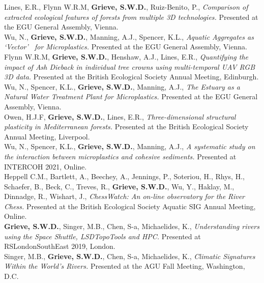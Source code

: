 \documentclass[10pt, a4paper]{article}
\newcommand{\student}{\textbf{\textsuperscript{\textdagger}}}
\newcommand{\years}[1]{\marginnote{\scriptsize #1}}
\begin{document}
\years{2023} Lines, E.R., Flynn W.R.M\student, \textbf{Grieve, S.W.D.}, Ruiz-Benito, P., \textit{Comparison of extracted ecological features of forests from multiple 3D technologies.} Presented at the EGU General Assembly, Vienna.\\[0.05cm]

\years{2023}Wu, N.\student, \textbf{Grieve, S.W.D.}, Manning, A.J., Spencer, K.L., \textit{Aquatic Aggregates as \lq Vector\rq~ for Microplastics.} Presented at the EGU General Assembly, Vienna.\\[0.05cm]

\years{2022} Flynn W.R.M\student, \textbf{Grieve, S.W.D.}, Henshaw, A.J., Lines, E.R., \textit{Quantifying the impact of Ash Dieback in individual tree crowns using multi-temporal UAV RGB 3D data.} Presented at the British Ecological Society Annual Meeting, Edinburgh.\\[0.05cm]

\years{2022}Wu, N.\student, Spencer, K.L., \textbf{Grieve, S.W.D.}, Manning, A.J., \textit{The Estuary as a Natural Water Treatment Plant for Microplastics.} Presented at the EGU General Assembly, Vienna.\\[0.05cm]

\years{2021}Owen, H.J.F, \textbf{Grieve, S.W.D.}, Lines, E.R., \textit{Three-dimensional structural plasticity in Mediterranean forests.} Presented at the British Ecological Society Annual Meeting, Liverpool.\\[0.05cm]

\years{2021}Wu, N.\student, Spencer, K.L., \textbf{Grieve, S.W.D.}, Manning, A.J., \textit{A systematic study on the interaction between microplastics and cohesive sediments.} Presented at INTERCOH 2021, Online.\\[0.05cm]

\years{2020}Heppell C.M., Bartlett, A., Beechey, A., Jennings, P., Soteriou, H., Rhys, H., Schaefer, B., Beck, C., Treves, R., \textbf{Grieve, S.W.D.}, Wu, Y., Haklay, M., Dinnadge, R., Wishart, J., \textit{ChessWatch: An on-line observatory for the River Chess.} Presented at the British Ecological Society Aquatic SIG Annual Meeting, Online.\\[0.05cm]

\years{2019}\textbf{Grieve, S.W.D.}, Singer, M.B., Chen, S-a, Michaelides, K., \textit{Understanding rivers using the Space Shuttle, LSDTopoTools and HPC.} Presented at RSLondonSouthEast 2019, London.\\[0.5cm]

\years{2018}Singer, M.B., \textbf{Grieve, S.W.D.}, Chen, S-a, Michaelides, K., \textit{Climatic Signatures Within the World’s Rivers.} Presented at the AGU Fall Meeting, Washington, D.C.\\[0.05cm]
\end{document}

